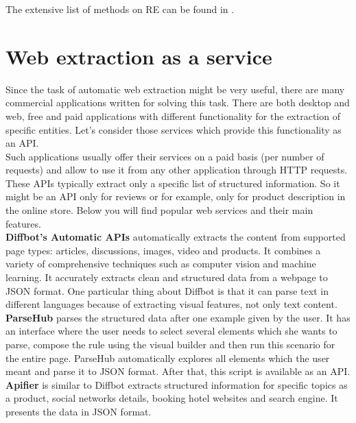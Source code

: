 The extensive list of methods on RE can be found in \cite{RegExtrSurvey}. 

\section{Web extraction as a service}

Since the task of automatic web extraction might be very useful, there are many commercial applications written for solving this task. There are both desktop and web, free and paid applications with different functionality for the extraction of specific entities. Let's consider those services which provide this functionality as an API.\\

Such applications usually offer their services on a paid basis (per number of requests) and allow to use it from any other application through HTTP requests. These APIs typically extract only a specific list of structured information. So it might be an API only for reviews or for example, only for product description in the online store. Below you will find popular web services and their main features.\\

\noindent \textbf{Diffbot's Automatic APIs} \cite{Diffbot} automatically extracts the content from supported page types: articles, discussions, images, video and products. It combines a variety of comprehensive techniques such as computer vision and machine learning. It accurately extracts clean and structured data from a webpage to JSON format. One particular thing about Diffbot is that it can parse text in different languages because of extracting visual features, not only text content.\\

\noindent\textbf{ParseHub} \cite{ParseHub} parses the structured data after one example given by the user. It has an interface where the user needs to select several elements which she wants to parse, compose the rule using the visual builder and then run this scenario for the entire page. ParseHub automatically explores all elements which the user meant and parse it to JSON format. After that, this script is available as an API.\\

\noindent\textbf{Apifier} \cite{Apifier} is similar to Diffbot extracts structured information for specific topics as a product, social networks details, booking hotel websites and search engine. It presents the data in JSON format.\\

